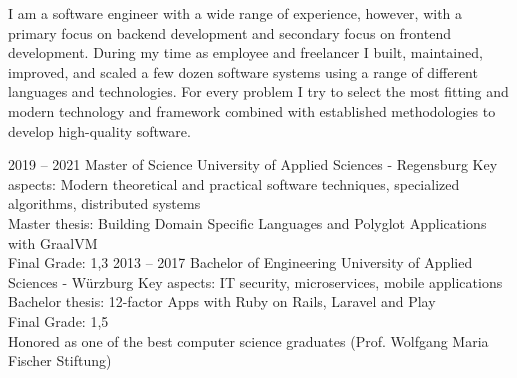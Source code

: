\documentclass[9pt]{../developercv} %
\begin{document}
\vspace{0.5cm}



\begin{minipage}[t]{0.4\textwidth} %
	\vspace{-\baselineskip} %
        I am a software engineer with a wide range of experience, however, with a primary focus on
        backend development and secondary focus on frontend development. During my time as employee
        and freelancer I built, maintained, improved, and scaled a few dozen software systems using
        a range of different languages and technologies. For every problem I try to select the most fitting
        and modern technology and framework combined with established methodologies to develop high-quality
        software.
\end{minipage}
\hfill %
\begin{minipage}[t]{0.55\textwidth} %
	\vspace{-\baselineskip} %
	\begin{barchart}{5.5}
	\end{barchart}
\end{minipage}



\begin{entrylist}
	\entry
		{2019 -- 2021}
		{Master of Science}
		{University of Applied Sciences - Regensburg}
		{Key aspects: Modern theoretical and practical software techniques, specialized algorithms, distributed systems\\Master thesis: Building Domain Specific Languages and Polyglot Applications with GraalVM\\Final Grade: 1,3}
	\entry
		{2013 -- 2017}
		{Bachelor of Engineering}
		{University of Applied Sciences - Würzburg}
		{Key aspects: IT security, microservices, mobile applications\\Bachelor thesis: 12-factor Apps with Ruby on Rails, Laravel and Play\\Final Grade: 1,5\\Honored as one of the best computer science graduates (Prof. Wolfgang Maria Fischer Stiftung)}
\end{entrylist}
\end{document}
